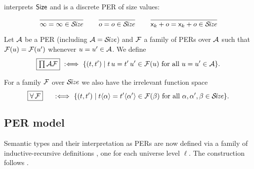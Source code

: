 \documentclass[acmsmall,screen]{acmart}\settopmatter{}
\makeatletter
\def\cneq{\@fleqnfalse}
\makeatother
\begin{document}
\fbox{$\SIZE$} interprets $\mathsf{Size}$ and is a discrete PER of size values:
\vspace{-1ex}
\begin{gather*}
  \ru{
    }{\infty = \infty \in \SIZE}
\qquad
  \ru{
    }{o = o \in \SIZE}
\qquad
  \ru{
    }{\lev k + o = \lev k + o \in \SIZE}
\end{gather*}

Let $\mathcal{A}$ be a PER (including $\mathcal{A} = \mathcal{S}\!\mathit{ize}$) and $\mathcal{F}$ a family of PERs over $\mathcal{A}$ such that
$\mathcal{F}(u) = \mathcal{F}(u')$ whenever $u = u' \in \mathcal{A}$.  We define
\[
  \fbox{$\prod\mathcal{A}\mathcal{F}$} \mathrel{\ :\Longleftrightarrow\ } \{(t,t') \mid t\,u = t'\,u' \in \mathcal{F}(u) \ \mbox{for all}\  u = u' \in \mathcal{A} \}
  .
\]

For a family $\mathcal{F}$ over $\SIZE$ we also have the irrelevant function space
\[
  \fbox{$\forall\,\mathcal{F}$} \quad \, \mathrel{\ :\Longleftrightarrow\ }
  \{(t,t') \mid t \langle\alpha\rangle = t' \langle\alpha'\rangle \in \mathcal{F}(\beta) \ \mbox{for all}\  \alpha,\alpha',\beta \in \mathcal{S}\!\mathit{ize} \}
  .
\]
\cneq




\subsection{PER model}
\label{sec:permodel}

Semantic types and their interpretation as PERs are now defined via a
family of inductive-recursive definitions \cite{dybjer:jsl00}, one for
each universe level $\ell$.  The construction follows \citet{abelCoquandDybjer:lics07}.
\end{document}
